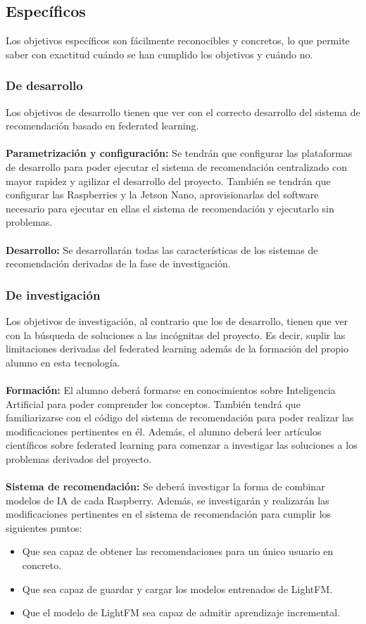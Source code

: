 \subsection{Específicos}
Los objetivos específicos son fácilmente reconocibles y concretos, lo que permite saber con exactitud cuándo se han cumplido los objetivos y cuándo no.

\subsubsection{De desarrollo}
Los objetivos de desarrollo tienen que ver con el correcto desarrollo del sistema de recomendación basado en federated learning. 
\\ \\
\textbf{Parametrización y configuración: }
Se tendrán que configurar las plataformas de desarrollo para poder ejecutar el sistema de recomendación centralizado con mayor rapidez y agilizar el desarrollo del proyecto. También se tendrán que configurar las Raspberries y la Jetson Nano, aprovisionarlas del software necesario para ejecutar en ellas el sistema de recomendación y ejecutarlo sin problemas.
\\ \\
\textbf{Desarrollo: }
Se desarrollarán todas las características de los sistemas de recomendación derivadas de la fase de investigación.

\subsubsection{De investigación}
Los objetivos de investigación, al contrario que los de desarrollo, tienen que ver con la búsqueda de soluciones a las incógnitas del proyecto. Es decir, suplir las limitaciones derivadas del federated learning además de la formación del propio alumno en esta tecnología.
\\ \\
\textbf{Formación: }
El alumno deberá formarse en conocimientos sobre Inteligencia Artificial para poder comprender los conceptos. También tendrá que familiarizarse con el código del sistema de recomendación para poder realizar las modificaciones pertinentes en él. Además, el alumno deberá leer artículos científicos sobre federated learning para comenzar a investigar las soluciones a los problemas derivados del proyecto.
\\ \\
\textbf{Sistema de recomendación: }
Se deberá investigar la forma de combinar modelos de IA de cada Raspberry. Además, se investigarán y realizarán las modificaciones pertinentes en el sistema de recomendación para cumplir los siguientes puntos:
\begin{itemize}
    \item Que sea capaz de obtener las recomendaciones para un único usuario en concreto. 
    \item Que sea capaz de guardar y cargar los modelos entrenados de LightFM.
    \item Que el modelo de LightFM sea capaz de admitir aprendizaje incremental.
\end{itemize}

